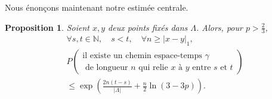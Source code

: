 \documentclass[titlepage,a4paper,12pt]{article}
\newcounter{d}
\newcounter{t}
\newcounter{p}
\newcounter{c}
\newcounter{a}
\newcounter{l}
\newtheorem{prop}[p]{Proposition}
\begin{document}
Nous énonçons maintenant notre estimée centrale.
\begin{prop} Soient $x,y$ deux points fixés dans $\Lambda$. Alors, pour $p>\frac{2}{3}$,
\begin{multline*}\forall s,t \in \mathbb{N}, \quad s<t, \quad \forall n \geqslant |x-y|_1,\\ P\left(\begin{array}{c}
\text{il existe un chemin espace-temps }\gamma\\ \text{ de longueur } n\text{ qui relie }x\text{ à }y \text{ entre }s\text{ et }t
\end{array}\right)\\  \leqslant \exp\left(\frac{2n(t-s)}{|\Lambda|}+\frac{n}{2}\ln(3-3p)\right).
\end{multline*}
\end{prop}
\end{document}
